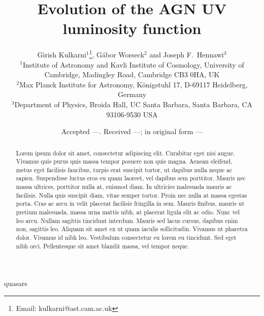 \documentclass[a4paper,fleqn,usenatbib]{mnras}
\title[AGN luminosity function]{Evolution of the AGN UV luminosity function}
\author[Kulkarni et al.]{{Girish Kulkarni$^{1}$\thanks{Email:
      kulkarni@ast.cam.ac.uk}, G\'abor Worseck$^{2}$ and Joseph
    F.~Hennawi$^{3}$} \\ $^1$Institute of Astronomy and Kavli
  Institute of Cosmology, University of Cambridge, Madingley Road,
  Cambridge CB3 0HA, UK \\ $^2$Max Planck Institute for Astronomy,
  K\"onigstuhl 17, D-69117 Heidelberg, Germany\\ $^3$Department of
  Physics, Broida Hall, UC Santa Barbara, Santa Barbara, CA 93106-9530
  USA}
\date{Accepted ---. Received ---; in original form ---}
\begin{document}
\label{firstpage}
\pagerange{\pageref{firstpage}--\pageref{lastpage}}
\maketitle

\begin{abstract}
  Lorem ipsum dolor sit amet, consectetur adipiscing elit. Curabitur
  eget nisi augue. Vivamus quis purus quis massa tempor posuere non
  quis magna. Aenean eleifend, metus eget facilisis faucibus, turpis
  erat suscipit tortor, ut dapibus nulla neque ac sapien. Suspendisse
  luctus eros eu quam laoreet, vel dapibus sem porttitor. Mauris nec
  massa ultrices, porttitor nulla at, euismod diam. In ultricies
  malesuada mauris ac facilisis. Nulla quis suscipit diam, vitae
  semper tortor. Proin nec nulla at massa egestas porta. Cras ac arcu
  in velit placerat facilisis fringilla in sem. Mauris finibus, mauris
  ut pretium malesuada, massa urna mattis nibh, at placerat ligula
  elit ac odio.  Nunc vel leo arcu. Nullam sagittis tincidunt
  interdum. Mauris sed lacus cursus, dapibus enim non, sagittis
  leo. Aliquam sit amet ex ut quam iaculis sollicitudin. Vivamus ut
  pharetra dolor. Vivamus id nibh leo. Vestibulum consectetur eu lorem
  eu tincidunt. Sed eget nibh orci. Pellentesque sit amet blandit
  massa, vel tempor neque.
\end{abstract}

\begin{keywords}
quasars
\end{keywords}



\end{document}
